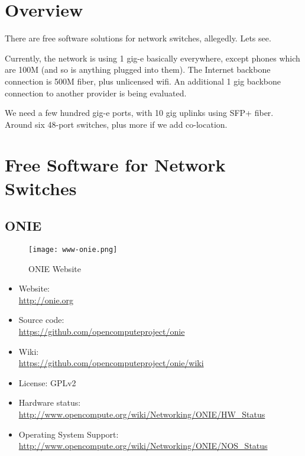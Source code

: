 %
%
%
%
%

\section{Overview}
There are free software solutions for network switches, allegedly. Lets see.


Currently, the network is using 1 gig-e basically everywhere, except phones
which are 100M (and so is anything plugged into them). The Internet backbone
connection is 500M fiber, plus unlicensed wifi. An additional 1 gig backbone
connection to another provider is being evaluated.


We need a few hundred gig-e ports, with 10 gig uplinks using SFP+ fiber.
Around six 48-port switches, plus more if we add co-location.


\section{Free Software for Network Switches}

\subsection{ONIE}
\begin{figure}[h!]
\texttt{[image: www-onie.png]}
 \caption{ONIE Website}
 \label{fig:www-onie}
\end{figure}


\begin{itemize}
 \item Website: \\ \url{http://onie.org}
 \item Source code: \\ \url{https://github.com/opencomputeproject/onie}
 \item Wiki: \\ \url{https://github.com/opencomputeproject/onie/wiki}
 \item License: GPLv2
 \item Hardware status: \\ \url{http://www.opencompute.org/wiki/Networking/ONIE/HW_Status}
 \item Operating System Support: \\ \url{http://www.opencompute.org/wiki/Networking/ONIE/NOS_Status}
\end{itemize}

